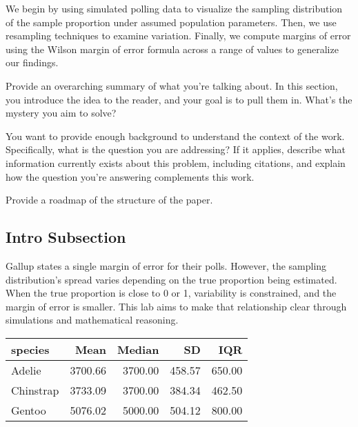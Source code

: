 \documentclass{article}\usepackage[]{graphicx}\usepackage[]{xcolor}
\newenvironment{Figure}
  {\par\medskip\noindent\minipage{\linewidth}}
  {\endminipage\par\medskip}
\begin{document}
\begin{multicols}{2}
We begin by using simulated polling data to visualize the sampling distribution of the sample proportion under assumed population parameters. Then, we use resampling techniques to examine variation. Finally, we compute margins of error using the Wilson margin of error formula across a range of values to generalize our findings.

Provide an overarching summary of what you're talking about. In this section, you introduce the idea to the reader, and your goal is to pull them in. What's the mystery you aim to solve?

You want to provide enough background to understand the context of the work. Specifically, what is the question you are addressing? If it applies, describe what information currently exists about this problem, including citations, and explain how the question you're answering complements this work.

Provide a roadmap of the structure of the paper. 

\subsection{Intro Subsection}
Gallup states a single margin of error for their polls. However, the sampling distribution's spread varies depending on the true proportion being estimated. When the true proportion is close to 0 or 1, variability is constrained, and the margin of error is smaller. This lab aims to make that relationship clear through simulations and mathematical reasoning.


\begin{Figure}
\centering
\begin{tabular}{lrrrr}
  \hline
species & Mean & Median & SD & IQR \\ 
  \hline
Adelie & 3700.66 & 3700.00 & 458.57 & 650.00 \\ 
  Chinstrap & 3733.09 & 3700.00 & 384.34 & 462.50 \\ 
  Gentoo & 5076.02 & 5000.00 & 504.12 & 800.00 \\ 
   \hline
\end{tabular}
\label{tab:penguins}
\end{Figure}


\end{multicols}
\end{document}
